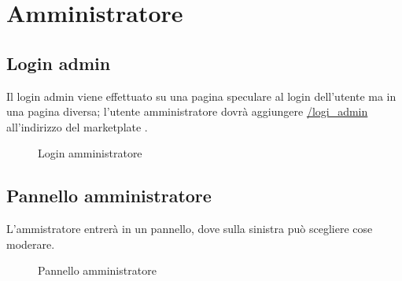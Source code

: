 \newpage
\section{Amministratore}
	\subsection{Login admin}
	Il login admin viene effettuato su una pagina speculare al login dell'utente ma in una pagina diversa; l'utente amministratore dovrà aggiungere \url{/logi_admin} all'indirizzo del marketplate \progetto.
	\label{Login amministratore}
	\begin{figure}[H]
		\centering
		\caption{Login amministratore}
	\end{figure}

\subsection{Pannello amministratore}
	L'ammistratore entrerà in un pannello, dove sulla sinistra può scegliere cose moderare.
	
		\label{Pannello amministratore}
	\begin{figure}[H]
		\centering
		\caption{Pannello amministratore}
	\end{figure}
	
